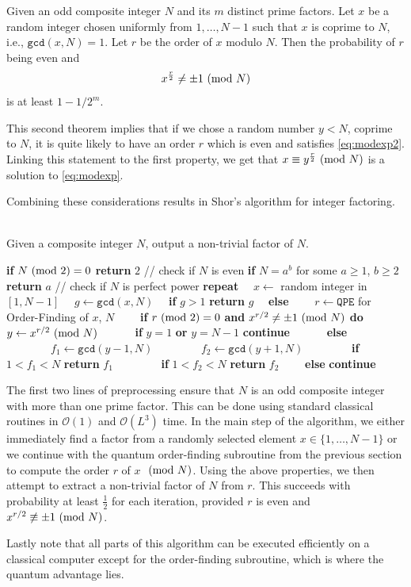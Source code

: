\begin{theorem*}
Given an odd composite integer $N$ and its $m$ distinct prime factors. Let $x$ be a random integer chosen uniformly from $1,\dots, N-1$ such that $x$ is coprime to $N$, i.e., $\texttt{gcd}(x,N)=1$. Let $r$ be the order of $x$ modulo $N$. Then the probability of $r$ being even and 
\begin{equation}
    x^{\frac{r}{2}}\neq \pm 1 \ (\mathrm{mod}\ N)
    \label{eq:modexp2}
\end{equation}
is at least $1-1/2^m$.
\end{theorem*}
This second theorem implies that if we chose a random number $y<N$, coprime to $N$, it is quite likely to have an order $r$ which is even and satisfies \eqref{eq:modexp2}. Linking this statement to the first property, we get that $x\equiv y^{\frac{r}{2}}\ (\mathrm{mod}\ N)$ is a solution to \eqref{eq:modexp}.

Combining these considerations results in Shor's algorithm for integer factoring.
\begin{algo*}\phantom{...}\\
Given a composite integer $N$, output a non-trivial factor of $N$.

\begin{algorithmic}
\STATE \textbf{if} $N \ (\mathrm{mod}\ 2) = 0$ \textbf{return} $2$ \hfill // check if $N$ is even
\STATE \textbf{if} $N = a^b$ for some $a \geq 1$, $b \geq 2$ \textbf{return} $a$ \hfill // check if $N$ is perfect power
\STATE \textbf{repeat}
\STATE $\quad x \gets$ random integer in $[1, N - 1]$
\STATE $\quad g \gets \texttt{gcd}(x, N)$
\STATE $\quad$\textbf{if} $g > 1$ \textbf{return} $g$
\STATE $\quad$\textbf{else}
\STATE $\quad\quad r \gets \texttt{QPE}$ for Order-Finding of $x$, $N$
\STATE $\quad\quad$\textbf{if} $r\ (\mathrm{mod}\ 2) = 0$ \textbf{and} $x^{r/2}\neq \pm 1\ (\mathrm{mod}\ N)$ \textbf{do} $y \gets x^{r/2} \ (\mathrm{mod}\ N)$
\STATE $\quad\quad\quad$\textbf{if} $y = 1$ \textbf{or} $y = N - 1$ \textbf{continue}
\STATE $\quad\quad\quad$\textbf{else}
\STATE $\quad\quad\quad\quad f_1 \gets \texttt{gcd}(y - 1, N)$
\STATE $\quad\quad\quad\quad f_2 \gets \texttt{gcd}(y + 1, N)$
\STATE $\quad\quad\quad\quad$\textbf{if} $1 < f_1 < N$ \textbf{return} $f_1$
\STATE $\quad\quad\quad\quad$\textbf{if} $1 < f_2 < N$ \textbf{return} $f_2$
\STATE $\quad\quad$\textbf{else} \textbf{continue}
\end{algorithmic}
\end{algo*}
The first two lines of preprocessing ensure that $N$ is an odd composite integer with more than one prime factor. This can be done using standard classical routines in $\mathcal{O}(1)$ and $\mathcal{O}\left(L^3\right)$ time. In the main step of the algorithm, we either immediately find a factor from a randomly selected element $x \in\{1, \ldots, N-1\}$ or we continue with the quantum order-finding subroutine from the previous section to compute the order $r$ of $x$ $\ (\mathrm{mod}\ N)$. Using the above properties, we then attempt to extract a non-trivial factor of $N$ from $r$. This succeeds with probability at least $\frac{1}{2}$ for each iteration, provided $r$ is even and $x^{r / 2} \not \equiv \pm 1 \ (\mathrm{mod}\ N)$.

Lastly note that all parts of this algorithm can be executed efficiently on a classical computer except for the order-finding subroutine, which is where the quantum advantage lies.
